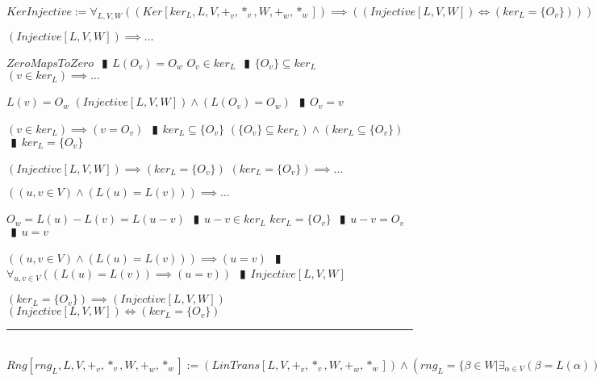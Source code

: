 \documentclass{book}
\newcommand{\abr}{:=}
\newcommand{\pipe}{$\phantom{(}\vrectangleblack\phantom{)}$}
\begin{document}
$KerInjective \abr \forall_{L, V, W}((Ker[ker_L, L, V, +_v, *_v, W, +_w, *_w]) \implies ((Injective[L, V, W]) \iff (ker_L = \{O_v\})))$
\begin{enumerate}
  \lit $(Injective[L, V, W]) \implies \ldots$
  \begin{enumerate}
    \lit $ZeroMapsToZero$ \pipe $L(O_v) = O_w$
    \lit $O_v \in ker_L$ \pipe $\{O_v\} \subseteq ker_L$
    \lit $(v \in ker_L) \implies \ldots$
    \begin{enumerate}
      \lit $L(v) = O_w$
      \lit $(Injective[L, V, W]) \land (L(O_v) = O_w)$ \pipe $O_v = v$
    \end{enumerate}
    \lit $(v \in ker_L) \implies (v = O_v)$ \pipe $ker_L \subseteq \{O_v\}$
    \lit $(\{O_v\} \subseteq ker_L) \land (ker_L \subseteq \{O_v\})$ \pipe $ker_L = \{O_v\}$
  \end{enumerate}
  \lit $(Injective[L, V, W]) \implies (ker_L = \{O_v\})$
  \lit $(ker_L = \{O_v\}) \implies \ldots$
  \begin{enumerate}
    \lit $((u, v \in V) \land (L(u) = L(v))) \implies \ldots$
    \begin{enumerate}
      \lit $O_w = L(u) - L(v) = L(u - v)$ \pipe $u - v \in ker_L$
      \lit $ker_L = \{O_v\}$ \pipe $u - v = O_v$ \pipe $u = v$
    \end{enumerate}
    \lit $((u, v \in V) \land (L(u) = L(v))) \implies (u = v)$ \pipe $\forall_{u, v \in V}((L(u) = L(v)) \implies (u = v))$ \pipe $Injective[L, V, W]$
  \end{enumerate}
  \lit $(ker_L = \{O_v\}) \implies (Injective[L, V, W])$
  \lit $(Injective[L, V, W]) \iff (ker_L = \{O_v\})$
\end{enumerate} \vspace{.75mm} \hrule \vspace{.75mm} \ \\ 

$Rng[rng_L, L, V, +_v, *_v, W, +_w, *_w] \abr (LinTrans[L, V, +_v, *_v, W, +_w, *_w]) \land (rng_L = \{\beta \in W | \exists_{\alpha \in V}(\beta = L(\alpha))\})$ \\
\end{document}
